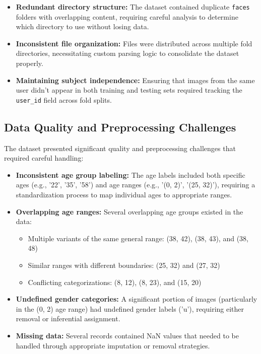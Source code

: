 \documentclass{article}
\begin{document}
\begin{itemize}
    \item \textbf{Redundant directory structure:} The dataset contained duplicate \texttt{faces} folders with overlapping content, requiring careful analysis to determine which directory to use without losing data.

    \item \textbf{Inconsistent file organization:} Files were distributed across multiple fold directories, necessitating custom parsing logic to consolidate the dataset properly.

    \item \textbf{Maintaining subject independence:} Ensuring that images from the same user didn't appear in both training and testing sets required tracking the \texttt{user\_id} field across fold splits.
\end{itemize}

\subsection{Data Quality and Preprocessing Challenges}
The dataset presented significant quality and preprocessing challenges that required careful handling:

\begin{itemize}
    \item \textbf{Inconsistent age group labeling:} The age labels included both specific ages (e.g., '22', '35', '58') and age ranges (e.g., '(0, 2)', '(25, 32)'), requiring a standardization process to map individual ages to appropriate ranges.

    \item \textbf{Overlapping age ranges:} Several overlapping age groups existed in the data:
    \begin{itemize}
        \item Multiple variants of the same general range: (38, 42), (38, 43), and (38, 48)
        \item Similar ranges with different boundaries: (25, 32) and (27, 32)
        \item Conflicting categorizations: (8, 12), (8, 23), and (15, 20)
    \end{itemize}

    \item \textbf{Undefined gender categories:} A significant portion of images (particularly in the (0, 2) age range) had undefined gender labels ('u'), requiring either removal or inferential assignment.

    \item \textbf{Missing data:} Several records contained NaN values that needed to be handled through appropriate imputation or removal strategies.
\end{itemize}
\end{document}

